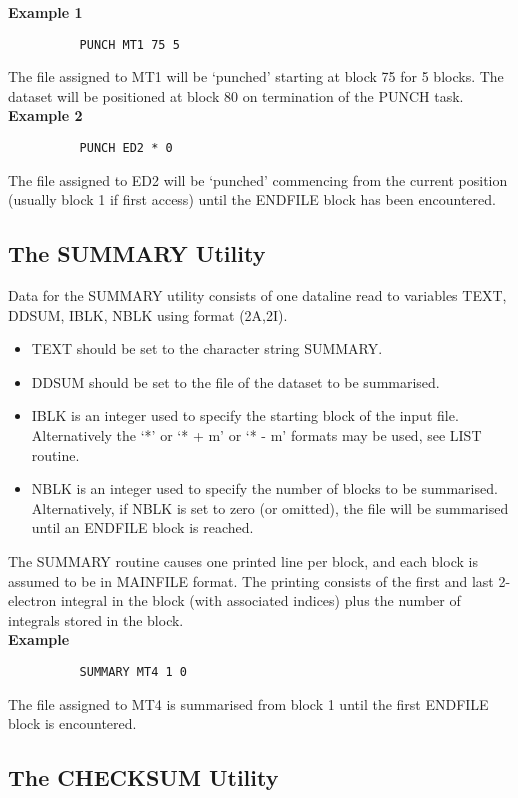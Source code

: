 \documentclass[11pt,fleqn]{article}
\begin{document}
{\bf Example 1}
{
\footnotesize
\begin{verbatim}
          PUNCH MT1 75 5
\end{verbatim}
}
 The  file assigned to MT1 will be `punched' starting at block 75
for 5 blocks. The dataset will be positioned at block 80 on termination
of the PUNCH task.\\

{\bf Example 2}
{
\footnotesize
\begin{verbatim}
          PUNCH ED2 * 0
\end{verbatim}
}
The file assigned to ED2 will be `punched' commencing from the
current position (usually block 1 if first access) until the ENDFILE
block has been encountered.


\subsection{The SUMMARY Utility}

Data for the SUMMARY utility consists of one dataline read to variables
TEXT, DDSUM, IBLK, NBLK using format (2A,2I).
\begin{itemize}
\item TEXT should be set to the character string SUMMARY.
\item DDSUM should be set to the file of the dataset to be summarised.
\item IBLK is an integer used to specify the starting block of the
input file. Alternatively the `*' or `* + m' or `* - m'
formats may be used, see LIST routine.
\item NBLK is an integer used to specify the number of blocks to be
summarised. Alternatively, if NBLK is set to zero (or
omitted), the file will be summarised until an ENDFILE
block is reached.
\end{itemize}
 The SUMMARY routine causes one printed line per block, and each
block is assumed to be in MAINFILE format. The printing consists of the
first and last 2-electron integral in the block (with associated
indices) plus the number of integrals stored in the block.\\

{\bf Example}
{
\footnotesize
\begin{verbatim}
          SUMMARY MT4 1 0
\end{verbatim}
}
The file assigned to MT4 is summarised from block 1 until the
first ENDFILE block is encountered.

\subsection{The CHECKSUM Utility}
\end{document}
